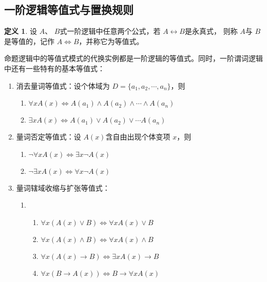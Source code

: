 \documentclass[a4paper,11pt]{article}%
\theoremstyle{remark}
\theoremstyle{remark}
\theoremstyle{definition}
\theoremstyle{definition}
\newtheorem*{definition}{定义}
\theoremstyle{plain}
\begin{document}
\subsection{一阶逻辑等值式与置换规则}
\begin{definition}
    设 $A$、 $B$式一阶逻辑中任意两个公式，若 $A\leftrightarrow B$是永真式，
    则称 $A$与 $B$是等值的，记作 $A\Leftrightarrow B$，并称它为等值式。
\end{definition}
命题逻辑中的等值式模式的代换实例都是一阶逻辑的等值式。同时，一阶谓词逻辑中还有一些特有的基本等值式：
\begin{enumerate}
    \item 消去量词等值式：设个体域为 $D=\{a_1,a_2,\cdots,a_n\}$，则 
    \begin{enumerate}
        \item $\forall xA(x)\Leftrightarrow A(a_1)\land A(a_2)\land\cdots\land A(a_n)$
        \item $\exists xA(x)\Leftrightarrow A(a_1)\lor A(a_2)\lor\cdots A(a_n)$
    \end{enumerate}
    \item 量词否定等值式：设 $A(x)$含自由出现个体变项 $x$，则 
    \begin{enumerate}
        \item $\lnot\forall xA(x)\Leftrightarrow \exists x\lnot A(x)$
        \item $\lnot \exists x A(x)\Leftrightarrow\forall x \lnot A(x)$
    \end{enumerate}
    \item 量词辖域收缩与扩张等值式：
    \begin{enumerate}
        \item 
    \begin{enumerate}
        \item $\forall x(A(x)\lor B)\Leftrightarrow\forall x A(x)\lor B$
        \item $\forall x(A(x)\land B)\Leftrightarrow\forall x A(x)\land B$
        \item  $\forall x (A(x)\rightarrow B)\Leftrightarrow\exists xA(x)\rightarrow B$
        \item  $\forall x(B\rightarrow A(x))\Leftrightarrow B\rightarrow \forall xA(x)$
    \end{enumerate}
    

\end{enumerate}
\end{enumerate}
\end{document}

